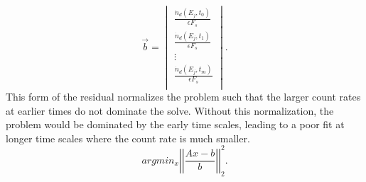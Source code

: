 \documentclass{style/nseJournal}
\begin{document}
\begin{equation}
\vec{b} = 
\begin{vmatrix}
\frac{\dot{n}_d(E_j, t_0)}{\epsilon F_s}\\
\frac{\dot{n}_d(E_j, t_1)}{\epsilon F_s}\\
\vdots\\
\frac{\dot{n}_d(E_j, t_m)}{\epsilon F_s}\\
\end{vmatrix}
\label{eq:bvecspec}.
\end{equation}
This form of the residual normalizes the problem such that the larger count rates at earlier times do not dominate the solve.
Without this normalization, the problem would be dominated by the early time scales, leading to a poor fit at longer time scales where the count rate is much smaller.
\begin{equation}
argmin_x \left| \left| \frac{Ax-b}{b} \right| \right|^2_2
\label{eq:residual-eqn}.
\end{equation}
\end{document}
